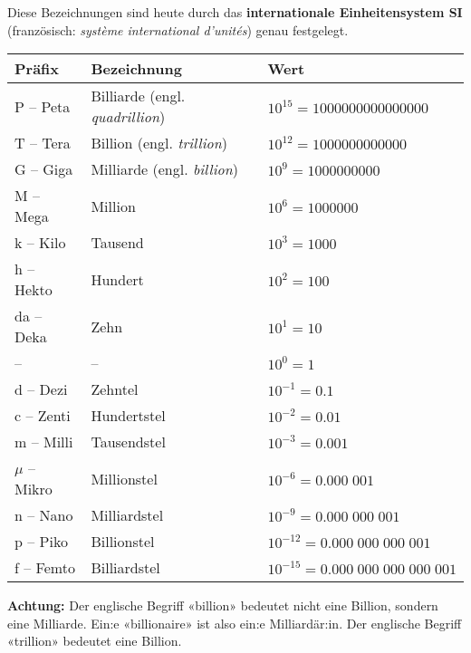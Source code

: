Diese Bezeichnungen sind heute durch das \textbf{internationale Einheitensystem SI} (französisch: \textit{système international d’unités}) genau festgelegt.

\begin{center}
  \renewcommand{\arraystretch}{1.1}
  \begin{tabularx}{0.9\textwidth}{lXX}
    \textbf{Präfix} & \textbf{Bezeichnung} & \textbf{Wert} \\
  \toprule
    P -- Peta & Billiarde (engl. \textit{quadrillion}) & $10^{15} = \num{1000000000000000}$ \\
  \midrule
    T -- Tera & Billion (engl. \textit{trillion}) & $10^{12} = \num{1000000000000}$ \\
  \midrule
    G -- Giga & Milliarde (engl. \textit{billion}) & $10^{9} = \num{1000000000}$ \\
  \midrule
    M -- Mega & Million & $10^{6} = \num{1000000}$ \\
  \midrule
    k -- Kilo & Tausend & $10^{3} = \num{1000}$ \\
  \midrule
    h -- Hekto & Hundert & $10^{2} = 100$ \\
  \midrule
    da -- Deka & Zehn & $10^{1} = 10$ \\
  \midrule
    -- & -- & $10^{0} = 1$ \\
  \midrule
    d -- Dezi & Zehntel & $10^{-1} = 0.1$ \\
  \midrule
    c -- Zenti & Hundertstel & $10^{-2} = 0.01$ \\
  \midrule
    m -- Milli & Tausendstel & $10^{-3} = 0.001$ \\
  \midrule
    $\mu$ -- Mikro & Millionstel & $10^{-6} = 0.000\;001$ \\
  \midrule
    n -- Nano & Milliardstel & $10^{-9} = 0.000\;000\;001$ \\
  \midrule
    p -- Piko & Billionstel & $10^{-12} = 0.000\;000\;000\;001$ \\
  \midrule
    f -- Femto & Billiardstel & $10^{-15} = 0.000\;000\;000\;000\;001$ \\
  \bottomrule
  \end{tabularx}
\end{center}

\begin{note}
\textbf{Achtung:} Der englische Begriff «billion» bedeutet nicht eine Billion, sondern eine Milliarde. Ein:e «billionaire» ist also ein:e Milliardär:in. Der englische Begriff «trillion» bedeutet eine Billion.
\end{note}
